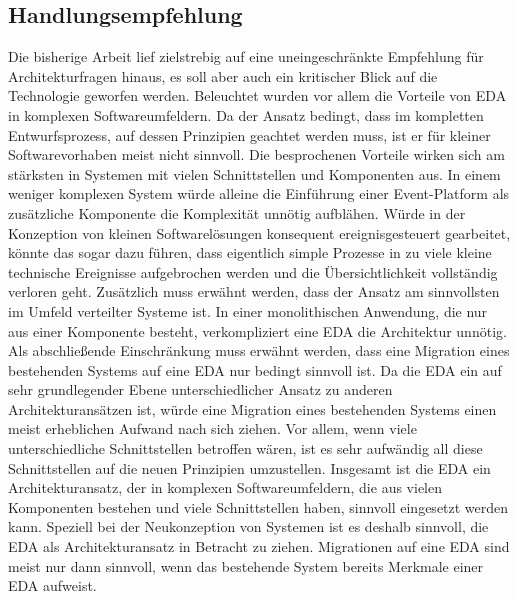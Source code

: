 \subsection{Handlungsempfehlung}
Die bisherige Arbeit lief zielstrebig auf eine uneingeschränkte Empfehlung für Architekturfragen hinaus, es soll aber auch ein kritischer Blick auf die Technologie geworfen werden. 
Beleuchtet wurden vor allem die Vorteile von \ac{EDA} in komplexen Softwareumfeldern. Da der Ansatz bedingt, dass im kompletten Entwurfsprozess, auf dessen Prinzipien geachtet werden muss, ist er für kleiner Softwarevorhaben meist nicht sinnvoll. Die besprochenen Vorteile wirken sich am stärksten in Systemen mit vielen Schnittstellen und Komponenten aus. In einem weniger komplexen System würde alleine die Einführung einer Event-Platform als zusätzliche Komponente die Komplexität unnötig aufblähen. Würde in der Konzeption von kleinen Softwarelösungen konsequent ereignisgesteuert gearbeitet, könnte das sogar dazu führen, dass eigentlich simple Prozesse in zu viele kleine technische Ereignisse aufgebrochen werden und die Übersichtlichkeit vollständig verloren geht. 
Zusätzlich muss erwähnt werden, dass der Ansatz am sinnvollsten im Umfeld verteilter Systeme ist. In einer monolithischen Anwendung, die nur aus einer Komponente besteht, verkompliziert eine \ac{EDA} die Architektur unnötig. 
Als abschließende Einschränkung muss erwähnt werden, dass eine Migration eines bestehenden Systems auf eine \ac{EDA} nur bedingt sinnvoll ist. Da die \ac{EDA} ein auf sehr grundlegender Ebene unterschiedlicher Ansatz zu anderen Architekturansätzen ist, würde eine Migration eines bestehenden Systems einen meist erheblichen Aufwand nach sich ziehen. Vor allem, wenn viele unterschiedliche Schnittstellen betroffen wären, ist es sehr aufwändig all diese Schnittstellen auf die neuen Prinzipien umzustellen. 
Insgesamt ist die \ac{EDA} ein Architekturansatz, der in komplexen Softwareumfeldern, die aus vielen Komponenten bestehen und viele Schnittstellen haben, sinnvoll eingesetzt werden kann. Speziell bei der Neukonzeption von Systemen ist es deshalb sinnvoll, die \ac{EDA} als Architekturansatz in Betracht zu ziehen. Migrationen auf eine \ac{EDA} sind meist nur dann sinnvoll, wenn das bestehende System bereits Merkmale einer \ac{EDA} aufweist.


